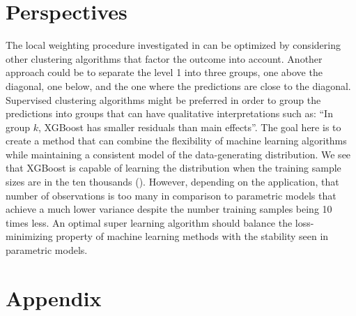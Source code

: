\documentclass[11pt, a4paper]{article}
\theoremstyle{definition}
\theoremstyle{remark}
\begin{document}
\section{Perspectives}
The local weighting procedure investigated in  can be optimized by considering other clustering algorithms that factor the outcome into account. Another approach could be to separate the level 1 into three groups, one above the diagonal, one below, and the one where the predictions are close to the diagonal. Supervised clustering algorithms might be preferred in order to group the predictions into groups that can have qualitative interpretations such as: ``In group $ k $, XGBoost has smaller residuals than main effects''. The goal here is to create a method that can combine the flexibility of machine learning algorithms while maintaining a consistent model of the data-generating distribution. We see that XGBoost is capable of learning the distribution when the training sample sizes are in the ten thousands (). However, depending on the application, that number of observations is too many in comparison to parametric models that achieve a much lower variance despite the number training samples being 10 times less. An optimal super learning algorithm should balance the loss-minimizing property of machine learning methods with the stability seen in parametric models. 



\newpage

\section{Appendix}
\end{document}
